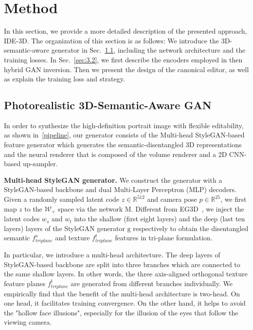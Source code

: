 \documentclass[acmtog]{acmart}
\begin{document}
\section{Method}




In this section, we provide a more detailed description of the presented approach, IDE-3D. The organization of this section is as follows: We introduce the 3D-semantic-aware generator in Sec.~\ref{sec:3.1}, including the network architecture and the training losses. In Sec.~\ref{sec:3.2}, we first describe the encoders employed in then hybrid GAN inversion. Then we present the design of the canonical editor, as well as explain the training loss and strategy. 




\subsection{Photorealistic 3D-Semantic-Aware GAN}
\label{sec:3.1}

In order to synthesize the high-definition portrait image with flexible editability, as shown in~\ref{pipeline}, our generator consists of the Multi-head StyleGAN-based feature generator which generates the semantic-disentangled 3D representations and the neural renderer that is composed of the volume renderer and a 2D CNN-based up-sampler.



\noindent \textbf{Multi-head StyleGAN generator.} 
We construct the generator with a StyleGAN-based backbone and dual Multi-Layer Perceptron (MLP) decoders.
Given a randomly sampled latent code $z\in \mathbb{R}^{512}$ and camera pose $p\in \mathbb{R}^{25}$, we first map $z$ to the $\mathcal{W}_+$ space via the network $\mathrm{M}$. Different from EG3D~\citet{eg3d}, we inject the latent codes $w_s$ and $w_t$ into the shallow (first eight layers) and the deep (last ten layers) layers of the StyleGAN generator $\mathrm{g}$ respectively to obtain the disentangled semantic $f^{s}_{triplane}$ and texture $f^{t}_{triplane}$ features in tri-plane formulation.



In particular, we introduce a multi-head architecture. The deep layers of StyleGAN-based backbone are split into three branches which are connected to the same shallow layers. In other words, the three axis-aligned orthogonal texture feature planes $f^{t}_{triplane}$ are generated from different branches individually. We empirically find that the benefit of the multi-head architecture is two-head. On one head, it facilitates training convergence. On the other hand, it helps to avoid the "hollow face illusions", especially for the illusion of the eyes that follow the viewing camera.
\end{document}
